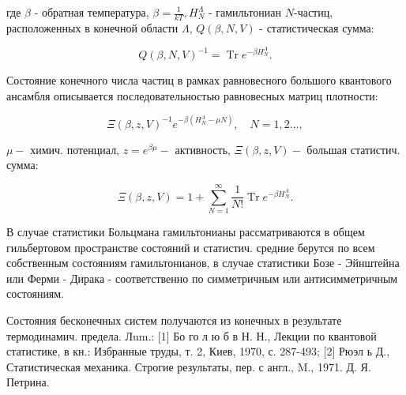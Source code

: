 \documentclass[10pt]{article}
\begin{document}
где $\beta$ - обратная температура, $\beta=\frac{1}{k T}, H_{N}^{\Lambda}$ - гамильтониан $N$-частиц, расположенных в конечной области $\Lambda$, $Q(\beta, N, V)$ - статистическая сумма:



\[

Q(\beta, N, V)^{-1}=\operatorname{Tr} e^{-\beta H_{N}^{\Lambda}} .

\]



Состояние конечного числа частиц в рамках равновесного большого квантового ансамбля описывается последовательностью равновесных матриц плотности:



\[

\Xi(\beta, z, V)^{-1} e^{-\beta\left(H_{N}^{\Lambda}-\mu N\right)}, \quad N=1,2 \ldots,

\]



$\mu-$ химич. потенциал, $z=e^{\beta \mu}-$ активность, $\Xi(\beta, z, V)-$ большая статистич. сумма:



\[

\Xi(\beta, z, V)=1+\sum_{N=1}^{\infty} \frac{1}{N !} \operatorname{Tr} e^{-\beta H_{N}^{\Lambda}} .

\]



В случае статистики Больцмана гамильтонианы рассматриваются в общем гильбертовом пространстве состояний и статистич. средние берутся по всем собственным состояниям гамильтонианов, в случае статистики Бозе - Эйнштейна или Ферми - Дирака - соответственно по симметричным или антисимметричным состояниям.



Состояния бесконечных систем получаются из конечных в результате термодинамич. предела. Лum.: [1] Бо го л ю б в Н. Н., Лекции по квантовой статистике, в кн.: Избранные труды, т. 2, Киев, 1970, с. 287-493; [2] Рюэл ь Д., Статистическая механика. Строгие результаты, пер. с англ., M., 1971. Д. Я. Петрина.
\end{document}
